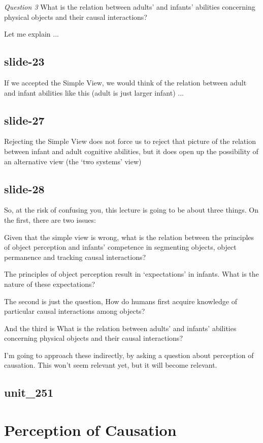 \documentclass[12pt,\papersize]{extarticle}
\begin{document}
\emph{Question 3} What is the relation between adults’ and infants’ abilities concerning physical objects and their causal interactions?
 
Let me explain ...
 
\subsection{slide-23}
If we accepted the Simple View, we would think of the relation between adult and infant
abilities like this (adult is just larger infant) ...
 
\subsection{slide-27}
Rejecting the Simple View does not force us to reject that picture of the relation between 
infant and adult cognitive abilities, but it does open up the possibility of an alternative 
view (the `two systems' view)
 
\subsection{slide-28}
So, at the risk of confusing you, this lecture is going to be about three things.
On the first, there are two issues:
 
Given that the simple view is wrong, what is the relation between the principles of object perception and infants’ competence in segmenting objects, object permanence and tracking causal interactions?
 
The principles of object perception result in ‘expectations’ in infants.  What is the nature of these expectations?
 
The second is just the question, How do humans first acquire knowledge of particular causal 
interactions among objects?
 
And the third is What is the relation between adults’ and infants’ abilities concerning physical objects and their causal interactions?
 
I'm going to approach these indirectly, by asking a question about perception of causation.
This won't seem relevant yet, but it will become relevant.
 
\subsection{unit\_251}
 
 
\section{Perception of Causation}
 
\end{document}
